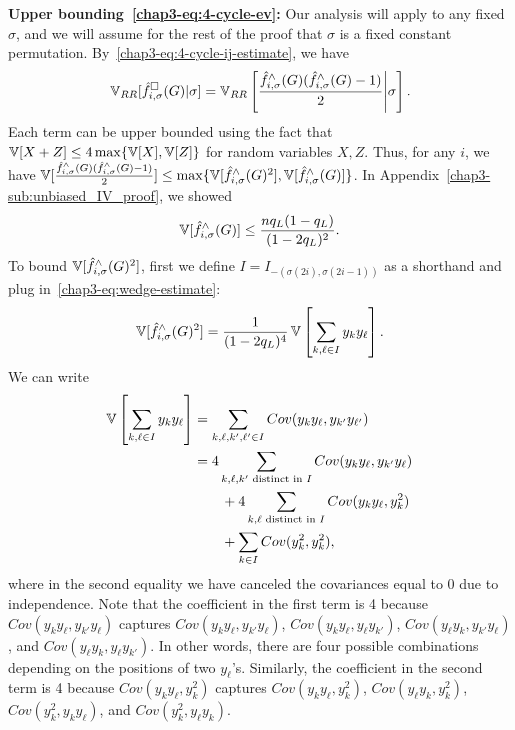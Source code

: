 \noindent\textbf{Upper bounding~\eqref{chap3-eq:4-cycle-ev}:}
Our analysis will apply to any fixed $\sigma$, and we will assume for the rest
of the proof that $\sigma$ is a fixed constant permutation.
By~\eqref{chap3-eq:4-cycle-ij-estimate}, we have
\[\operatorname{\mathbb{V}}_{RR}[\hat{f}_{i,\sigma}^\square(G)|\sigma] =
\operatorname{\mathbb{V}}_{RR}\left[\frac{\hat{f}_{i,\sigma}^\wedge(G)(\hat{f}_{i,\sigma}^\wedge(G)-1)}{2}\middle|\sigma\right].\] Each term
can be upper bounded using the fact that $\operatorname{\mathbb{V}}[X+Z] \leq 4 \max\{\operatorname{\mathbb{V}}[X], \operatorname{\mathbb{V}}[Z]\}$
for random variables $X,Z$.
Thus, for any $i$, we have
$\operatorname{\mathbb{V}}[\frac{\hat{f}_{i,\sigma}^\wedge(G)(\hat{f}_{i,\sigma}^\wedge(G)-1)}{2}]
\leq \max\{\operatorname{\mathbb{V}}[\hat{f}^\wedge_{i,\sigma}(G)^2], \operatorname{\mathbb{V}}[\hat{f}_{i,\sigma}^\wedge(G)]\}$. In
Appendix~\ref{chap3-sub:unbiased_IV_proof}, we showed
\begin{equation}\label{chap3-eq:4-cycle-l2-varI}
  \operatorname{\mathbb{V}}[\hat{f}^\wedge_{i,\sigma}(G)] \leq \frac{n q_L(1-q_L)}{(1-2q_L)^2}.
\end{equation}
To bound $\operatorname{\mathbb{V}}[\hat{f}^\wedge_{i,\sigma}(G)^2]$, first we define $I = I_{-(\sigma(2i), \sigma(2i-1))}$ as a shorthand and
plug
in~\eqref{chap3-eq:wedge-estimate}:
\begin{align*}
    \operatorname{\mathbb{V}}[\hat{f}_{i,\sigma}^\wedge(G)^2] = \frac{1}{(1-2q_L)^4} \operatorname{\mathbb{V}}\left[ \sum_{k,\ell \in I} y_{k} y_{\ell}\right].
\end{align*}
We can write
\begin{align*}
    \operatorname{\mathbb{V}}\left[ \sum_{k,\ell \in I} y_k y_\ell \right] &= \sum_{k,\ell, k', \ell' \in I} Cov(y_k y_\ell, y_{k'} y_{\ell'}) \\
    &= 4 \sum_{k,\ell,k' \text{ distinct in } I} Cov(y_k y_\ell, y_{k'} y_\ell) \\
    &\qquad+ 4 \sum_{k,\ell \text{ distinct in } I} Cov(y_k y_\ell, y_k^2) \\
    &\qquad+ \sum_{k \in I} Cov(y_k^2, y_k^2),
\end{align*}
where in the second equality we have canceled the covariances equal to $0$ due to independence.
Note that the coefficient in the first term is 4 because $Cov(y_k y_\ell, \allowbreak y_{k'} y_\ell)$ captures
$Cov(y_k y_\ell, \allowbreak y_{k'} y_\ell)$, $Cov(y_k y_\ell,\allowbreak  y_\ell y_{k'})$, $Cov(y_\ell y_k, \allowbreak y_{k'} y_\ell)$, and $Cov(y_\ell y_k, \allowbreak y_\ell y_{k'})$.
In other words, there are four possible combinations depending on the positions of two $y_\ell$'s.
Similarly, the coefficient in the second term is 4 because $Cov(y_k y_\ell, \allowbreak y_k^2)$ captures
$Cov(y_k y_\ell, \allowbreak y_k^2)$,
$Cov(y_\ell y_k, \allowbreak y_k^2)$,
$Cov(y_k^2, \allowbreak y_k y_\ell)$, and
$Cov(y_k^2, \allowbreak y_\ell y_k)$.


